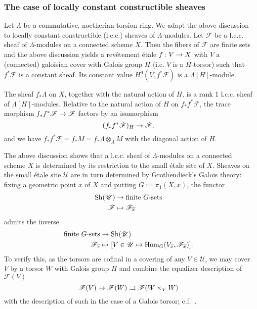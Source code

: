 \documentclass[deligne.tex]{subfiles}
\begin{document}
\subsubsection*{The case of locally constant constructible sheaves}
Let $\Lambda$ be a commutative, noetherian torsion ring. We adapt the above
discussion to locally constant constructible (l.c.c.) sheaves of
$\Lambda$-modules. Let $\mathscr F$ be a l.c.c. sheaf of $\Lambda$-modules
on a connected scheme $X$. Then the fibers of $\mathscr F$ are finite sets 
and the above discussion yields a revêtement étale $f:V\rightarrow X$ with $V$ a
(connected) galoisian cover with Galois group $H$
(i.e. $V$ is a $H$-torsor) such that $f^\ast\mathscr F$ is a constant sheaf.
Its constant value $H^0(V,f^\ast\mathscr F)$ is a $\Lambda[H]$-module.

The sheaf $f_\ast\Lambda$ on $X$, together with the natural action of $H$,
is a rank 1 l.c.c. sheaf of $\Lambda[H]$-modules.
Relative to the natural action of $H$ on $f_\ast f^\ast\mathscr F$, the
trace morphism $f_\ast f^\ast\mathscr F\rightarrow\mathscr F$ factors by an
isomorphism
\begin{equation*} (f_\ast f^\ast\mathscr F)_H\rightarrow\mathscr F, \end{equation*}
and we have
$f_\ast f^\ast\mathscr F=f_\ast M=f_\ast\Lambda\otimes_\Lambda M$
with the diagonal action of $H$.

The above discussion shows that a l.c.c. sheaf of $\Lambda$-modules on a
connected scheme $X$ is determined by its restriction to the small étale
site of $X$. Sheaves on the small étale site $\mathscr U$ are in turn
determined by Grothendieck's Galois theory: fixing a geometric point
$\overline x$ of $X$ and putting $G:=\pi_1(X,\overline x)$, the functor
\begin{align*}
	\operatorname{Sh}(\mathscr U)&\rightarrow \text{finite }G\text{-sets} \\
	\mathscr F&\mapsto\mathscr F_{\overline x}
\end{align*}
admits the inverse
\begin{align*}
	\text{finite }G\text{-sets}&\rightarrow\operatorname{Sh}(\mathscr U) \\
	\mathscr F_{\overline x}&\mapsto
	[V\in\mathscr U\mapsto\operatorname{Hom}_G(V_{\overline x},\mathscr F_{\overline x})].
\end{align*}
To verify this, as the torsors are cofinal in a covering of any
$V\in\mathscr U$, we may cover $V$ by a torsor $W$ with Galois group $H$
and combine the equalizer description of $\mathscr F(V)$
\begin{equation*}
	\mathscr F(V)\rightarrow\mathscr F(W)
	\rightrightarrows\mathscr F(W\times_V W)
\end{equation*}
with the description of such in the case of a Galois torsor;
c.f.~\cite[I \S5]{SGA4.5}.
\end{document}
